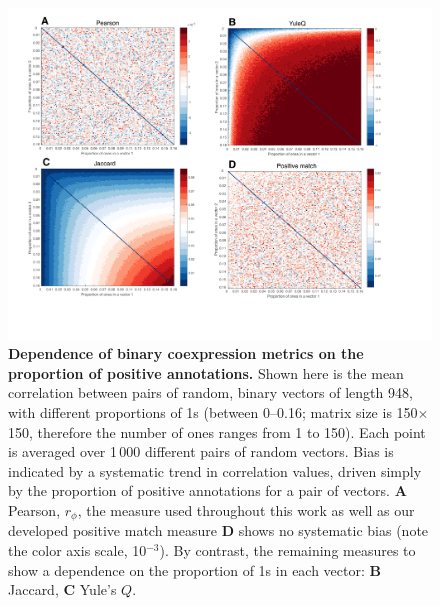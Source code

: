 \documentclass[10pt,letterpaper]{article}
\begin{document}
\begin{figure}[h]
\centering
    \includegraphics[width=1\textwidth]{CoexpressionMeasures.pdf}
\caption{
\label{fig:S_propOnes}
\textbf{Dependence of binary coexpression metrics on the proportion of positive annotations.}
Shown here is the mean correlation between pairs of random, binary vectors of length 948, with different proportions of 1s (between 0--0.16; matrix size is 150$\times$150, therefore the number of ones ranges from 1 to 150).
Each point is averaged over 1\,000 different pairs of random vectors.
Bias is indicated by a systematic trend in correlation values, driven simply by the proportion of positive annotations for a pair of vectors.
\textbf{A} Pearson, $r_\phi$, the measure used throughout this work as well as our developed positive match measure \textbf{D} shows no systematic bias (note the color axis scale, 10$^{-3}$).
By contrast, the remaining measures to show a dependence on the proportion of 1s in each vector:
\textbf{B} Jaccard,
\textbf{C} Yule's $Q$.
}
\end{figure}
\end{document}
